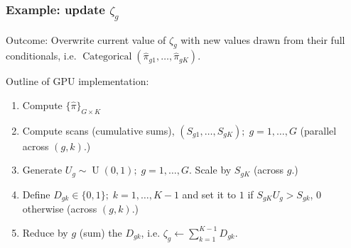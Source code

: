 \documentclass[handout]{beamer}
\newcommand{\op}{\operatorname}
\begin{document}
\begin{frame}%
  \frametitle{Example: update $\zeta_g$}
  Outcome: Overwrite current value of $\zeta_g$ with new values drawn from their full conditionals, i.e. $\op{Categorical}(\hat{\pi}_{g1},\ldots,\hat{\pi}_{gK})$.

  \vspace{.7cm}
  Outline of GPU implementation:
  \small
  \begin{enumerate}
    \pause\item Compute $\{\hat{\pi}\}_{G\times K}$
    \pause\item Compute scans (cumulative sums), $(S_{g1},\ldots,S_{gK});\;g=1,\ldots,G$ (parallel across $(g,k)$.)
    \pause\item Generate $U_g \sim \op{U}(0,1);\;g=1,\ldots,G$. Scale by $S_{gK}$ (across $g$.)
    \pause\item Define $D_{gk} \in \{0,1\};\;k=1,\ldots,K-1$ and set it to $1$ if $S_{gK}U_g > S_{gk}$, $0$ otherwise (across $(g,k)$.)
    \pause\item Reduce by $g$ (sum) the $D_{gk}$, i.e. $\zeta_g \leftarrow \sum_{k=1}^{K-1} D_{gk}$.
  \end{enumerate}
\end{frame}
\end{document}
